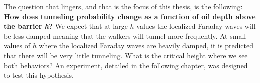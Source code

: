 The question that lingers, and that is the focus of this thesis, is the following: \textbf{How does tunneling probability change as a function of oil depth above the barrier \textbf{\textit{h}}?} We expect that at large $h$ values the localized Faraday waves will be less damped meaning that the walkers will tunnel more frequently. At small values of $h$ where the localized Faraday waves are heavily damped, it is predicted that there will be very little tunneling. What is the critical height where we see both behaviors? An experiment, detailed in the following chapter, was designed to test this hypothesis.